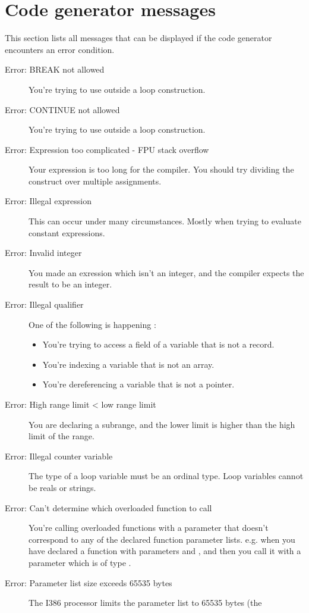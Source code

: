  \section{Code generator messages}
 This section lists all messages that can be displayed if the code
 generator encounters an error condition.
 \begin{description}
\item [Error: BREAK not allowed]
 You're trying to use  outside a loop construction.
\item [Error: CONTINUE not allowed]
 You're trying to use  outside a loop construction.
\item [Error: Expression too complicated - FPU stack overflow]
 Your expression is too long for the compiler. You should try dividing the
 construct over multiple assignments.
\item [Error: Illegal expression]
 This can occur under many circumstances. Mostly when trying to evaluate
 constant expressions.
\item [Error: Invalid integer]
 You made an exression which isn't an integer, and the compiler expects the
 result to be an integer.
\item [Error: Illegal qualifier]
 One of the following is happening :
 \begin{itemize}
 \item You're trying to access a field of a variable that is not a record.
 \item You're indexing a variable that is not an array.
 \item You're dereferencing a variable that is not a pointer. 
 \end{itemize}
\item [Error: High range limit < low range limit]
 You are declaring a subrange, and the lower limit is higher than the high
 limit of the range.
\item [Error: Illegal counter variable]
 The type of a  loop variable must be an ordinal type.
 Loop variables cannot be reals or strings.
\item [Error: Can't determine which overloaded function to call]
 You're calling overloaded functions with a parameter that doesn't correspond
 to any of the declared function parameter lists. e.g. when you have declared
 a function with parameters  and , and then you call
 it with a parameter which is of type .
\item [Error: Parameter list size exceeds 65535 bytes]
 The I386 processor limits the parameter list to 65535 bytes (the 

\end{description}
